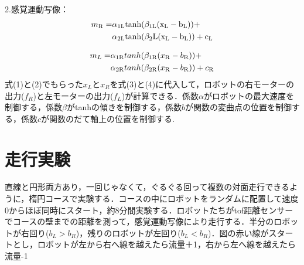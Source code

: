 \documentclass[twocolumn]{jarticle} %
\begin{document}
2.感覚運動写像：
\begin{equation}
\begin{aligned}
  m_{\rm R} = &\alpha_{1{\rm L}} \rm tanh(\beta_{1{\rm L}}(x_{\rm L} - b_{\rm L})) + \\
        &\alpha_{2{\rm L}} \rm tanh(\beta_2{\rm L}(x_{\rm L} - b_{\rm L})) + c_L
\end{aligned}
\end{equation}

\begin{equation}
\begin{aligned}
  m_L = &\alpha_{1{\rm R}}tanh(\beta_{1{\rm R}}(x_{\rm R} - b_{\rm R})) + \\
        &\alpha_{2{\rm R}}tanh(\beta_{2{\rm R}}(x_{\rm R} - b_{\rm R})) + c_{\rm R}
\end{aligned}
\end{equation}
式(1)と(2)でもらった$x_L$と$x_R$を式(3)と(4)に代入して，ロボットの右モーターの出力($f_R$)と左モーターの出力($f_L$)が計算できる．係数$\alpha$がロボットの最大速度を制御する，係数$\beta$がtanhの傾きを制御する，係数$b$が関数の変曲点の位置を制御する，係数$c$が関数のだて軸上の位置を制御する. 



\section{走行実験}
直線と円形両方あり，一回じゃなくて，ぐるぐる回って複数の対面走行できるように，楕円コースで実験する．コースの中にロボットをランダムに配置して速度0からほぼ同時にスタート，約8分間実験する．ロボットたちがtof距離センサーでコースの壁までの距離を測って，感覚運動写像により走行する．半分のロボットが右回り($b_L>b_R$)，残りのロボットが左回り($b_L<b_R$)．図の赤い線がスタートとし，ロボットが左から右へ線を越えたら流量＋1，右から左へ線を越えたら流量-1
\end{document}
